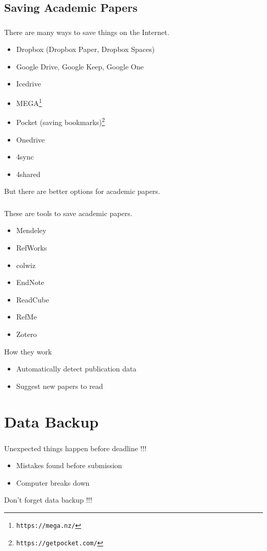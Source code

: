 \documentclass[dvipdfmx,10pt]{beamer}
\newcommand{\bb}{\begin{block}}
\newcommand{\eb}{\end{block}}
\newcommand{\ft}{\frametitle}
\newcommand{\bit}{\begin{itemize}}
\newcommand{\eit}{\end{itemize}}
\begin{document}
\subsection{Saving Academic Papers}
\begin{frame}\ft{\insertsubsection}
There are many ways to save things on the Internet.
\bit
\item Dropbox (Dropbox Paper, Dropbox Spaces)
\item Google Drive, Google Keep, Google One
\item Icedrive
\item MEGA\footnote{\texttt{https://mega.nz/}}
\item Pocket (saving bookmarks)\footnote{\texttt{https://getpocket.com/}}
\item Onedrive
\item 4sync
\item 4shared
\eit
But there are better options for academic papers.
\end{frame}
\begin{frame}\ft{\insertsubsection}
These are tools to save academic papers.
\bit
\item Mendeley
\item RefWorks
\item colwiz
\item EndNote
\item ReadCube
\item RefMe
\item Zotero
\eit
\bb{How they work}
\bit
\item Automatically detect publication data
\item Suggest new papers to read
\eit
\eb
\end{frame}
\section{Data Backup}
\begin{frame}\ft{\insertsection}
Unexpected things happen before deadline !!!
\begin{exampleblock}{}
\bit
\item Mistakes found before submission
\item Computer breaks down
\eit
\end{exampleblock}
Don't forget data backup !!!
\end{frame}
\end{document}
